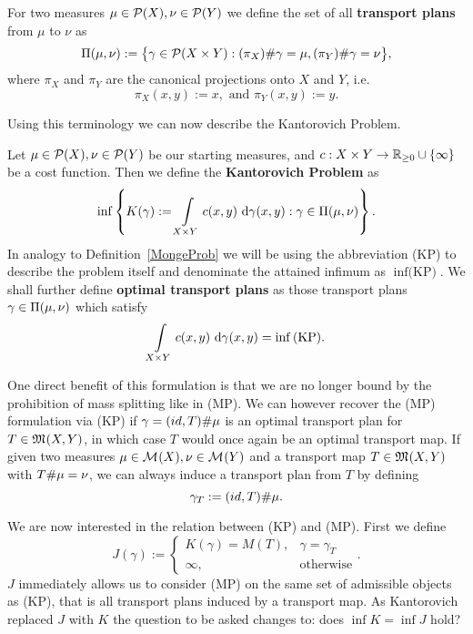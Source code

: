 \begin{definition}\label{TransPlans}
	For two measures $\mu \in \PM{X}, \nu \in \PM{Y}$ we define the set of all \textbf{transport plans} from $\mu$ to $\nu$ as
	\[ \TP{\mu}{\nu} := \big\{ \gamma \in \PM{X \times Y} : \push[(\pi_X)]{\gamma} = \mu, \push[(\pi_Y)]{\gamma} = \nu \big\}, \]
	where $\pi_X$ and $\pi_Y$ are the canonical projections onto $X$ and $Y$, i.e.
	\[ \pi_X(x, y) := x, \text{ and } \pi_Y(x, y) := y. \]
\end{definition}

Using this terminology we can now describe the Kantorovich Problem.

\begin{definition}\label{KanProb}
	Let $\mu \in \PM{X}, \nu \in \PM{Y}$ be our starting measures, and $\map[c]{X \times Y}{\RZero \cup \{\infty\}}$ be a cost function. Then we define the \textbf{Kantorovich Problem} as
	\begin{equation}\label{KP}
		\inf \left\{ K(\gamma) := \int\limits_{X \times Y} c(x, y)~\Dx[x, y]{\gamma} : \gamma \in \TP{\mu}{\nu} \right\}.
	\end{equation}
	In analogy to Definition~\ref{MongeProb} we will be using the abbreviation (KP) to describe the problem itself and denominate the attained infimum as $\inf \text{(KP)}$. We shall further define \textbf{optimal transport plans} as those transport plans $\gamma \in \TP{\mu}{\nu}$ which satisfy
	\[ \int\limits_{X \times Y} c(x, y)~\Dx[x, y]{\gamma} = \inf \text{(KP)}. \]
\end{definition}

One direct benefit of this formulation is that we are no longer bound by the prohibition of mass splitting like in (MP). We can however recover the (MP) formulation via (KP) if $\gamma = \push[(id, T)]{\mu}$ is an optimal transport plan for $T \in \MF{X}{Y}$, in which case $T$ would once again be an optimal transport map. If given two measures $\mu \in \M{X}, \nu \in \M{Y}$ and a transport map $T \in \MF{X}{Y}$ with $\push{\mu} = \nu$, we can always induce a transport plan from $T$ by defining
\begin{equation}\label{IndPlan}
	\gamma_T := \push[(id, T)]{\mu}.
\end{equation}

We are now interested in the relation between (KP) and (MP). First we define
\[ J(\gamma) := 
	\begin{cases}
		K(\gamma) = M(T), & \gamma = \gamma_T \\
		\infty, & \text{otherwise}
	\end{cases}. \]
$J$ immediately allows us to consider (MP) on the same set of admissible objects as (KP), that is all transport plans induced by a transport map. As Kantorovich replaced $J$ with $K$ the question to be asked changes to: does $\inf K = \inf J$ hold?

